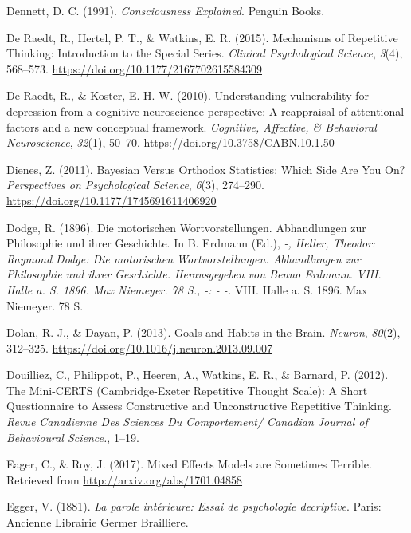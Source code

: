 \documentclass[a4paper,12pt,twoside,onecolumn,openright,final,oldfontcommands]{memoir}
\begin{document}
\leavevmode\hypertarget{ref-dennett_consciousness_1991}{}%
Dennett, D. C. (1991). \emph{Consciousness Explained}. Penguin Books.

\leavevmode\hypertarget{ref-de_raedt_mechanisms_2015}{}%
De Raedt, R., Hertel, P. T., \& Watkins, E. R. (2015). Mechanisms of Repetitive Thinking: Introduction to the Special Series. \emph{Clinical Psychological Science}, \emph{3}(4), 568--573. \url{https://doi.org/10.1177/2167702615584309}

\leavevmode\hypertarget{ref-Raedt2010}{}%
De Raedt, R., \& Koster, E. H. W. (2010). Understanding vulnerability for depression from a cognitive neuroscience perspective: A reappraisal of attentional factors and a new conceptual framework. \emph{Cognitive, Affective, \& Behavioral Neuroscience}, \emph{32}(1), 50--70. \url{https://doi.org/10.3758/CABN.10.1.50}

\leavevmode\hypertarget{ref-dienes_bayesian_2011}{}%
Dienes, Z. (2011). Bayesian Versus Orthodox Statistics: Which Side Are You On? \emph{Perspectives on Psychological Science}, \emph{6}(3), 274--290. \url{https://doi.org/10.1177/1745691611406920}

\leavevmode\hypertarget{ref-dodge_motorischen_1896}{}%
Dodge, R. (1896). Die motorischen Wortvorstellungen. Abhandlungen zur Philosophie und ihrer Geschichte. In B. Erdmann (Ed.), \emph{-, Heller, Theodor: Raymond Dodge: Die motorischen Wortvorstellungen. Abhandlungen zur Philosophie und ihrer Geschichte. Herausgegeben von Benno Erdmann. VIII. Halle a. S. 1896. Max Niemeyer. 78 S., -: - -.} VIII. Halle a. S. 1896. Max Niemeyer. 78 S.

\leavevmode\hypertarget{ref-dolan_goals_2013}{}%
Dolan, R. J., \& Dayan, P. (2013). Goals and Habits in the Brain. \emph{Neuron}, \emph{80}(2), 312--325. \url{https://doi.org/10.1016/j.neuron.2013.09.007}

\leavevmode\hypertarget{ref-Douilliez2012}{}%
Douilliez, C., Philippot, P., Heeren, A., Watkins, E. R., \& Barnard, P. (2012). The Mini-CERTS (Cambridge-Exeter Repetitive Thought Scale): A Short Questionnaire to Assess Constructive and Unconstructive Repetitive Thinking. \emph{Revue Canadienne Des Sciences Du Comportement/ Canadian Journal of Behavioural Science.}, 1--19.

\leavevmode\hypertarget{ref-eager_mixed_2017}{}%
Eager, C., \& Roy, J. (2017). Mixed Effects Models are Sometimes Terrible. Retrieved from \url{http://arxiv.org/abs/1701.04858}

\leavevmode\hypertarget{ref-egger_parole_1881}{}%
Egger, V. (1881). \emph{La parole intérieure: Essai de psychologie decriptive}. Paris: Ancienne Librairie Germer Brailliere.
\end{document}
